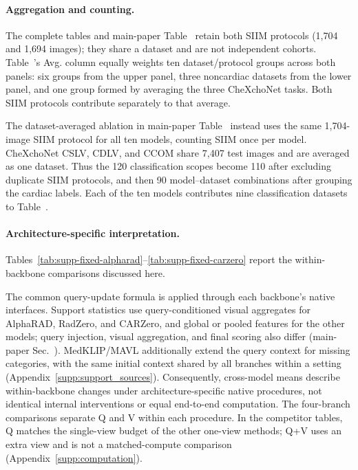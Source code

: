 \paragraph{Aggregation and counting.}
The complete tables and main-paper Table~ retain both SIIM protocols (1,704 and 1,694 images); they share a dataset and are not independent cohorts. Table~'s Avg. column equally weights ten dataset/protocol groups across both panels: six groups from the upper panel, three noncardiac datasets from the lower panel, and one group formed by averaging the three CheXchoNet tasks. Both SIIM protocols contribute separately to that average.

The dataset-averaged ablation in main-paper Table~ instead uses the same 1,704-image SIIM protocol for all ten models, counting SIIM once per model. CheXchoNet CSLV, CDLV, and CCOM share 7,407 test images and are averaged as one dataset. Thus the 120 classification scopes become 110 after excluding duplicate SIIM protocols, and then 90 model--dataset combinations after grouping the cardiac labels. Each of the ten models contributes nine classification datasets to Table~.

\paragraph{Architecture-specific interpretation.}
\label{supp:native_averages}
Tables~\ref{tab:supp-fixed-alpharad}--\ref{tab:supp-fixed-carzero} report the within-backbone comparisons discussed here.

The common query-update formula is applied through each backbone's native interfaces. Support statistics use query-conditioned visual aggregates for AlphaRAD, RadZero, and CARZero, and global or pooled features for the other models; query injection, visual aggregation, and final scoring also differ (main-paper Sec.~). MedKLIP/MAVL additionally extend the query context for missing categories, with the same initial context shared by all branches within a setting (Appendix~\ref{supp:support_sources}). Consequently, cross-model means describe within-backbone changes under architecture-specific native procedures, not identical internal interventions or equal end-to-end computation. The four-branch comparisons separate Q and V within each procedure. In the competitor tables, Q matches the single-view budget of the other one-view methods; Q+V uses an extra view and is not a matched-compute comparison (Appendix~\ref{supp:computation}).

